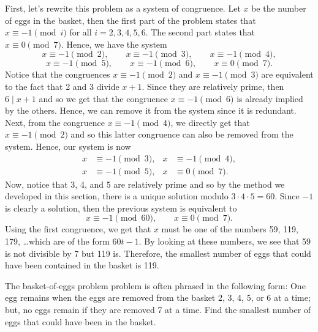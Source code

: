 \begin{solution}
    First, let's rewrite this problem as a system of congruence. Let $x$ be the number of eggs in the basket, then the first part of the problem states that $x \equiv -1 \pmod{i}$ for all $i = 2,3,4,5,6$. The second part states that $x \equiv 0 \pmod 7$. Hence, we have the system
    $$x \equiv -1 \pmod 2, \qquad x \equiv -1 \pmod 3, \qquad x \equiv -1 \pmod 4,$$
    $$x \equiv -1 \pmod 5, \qquad x \equiv -1 \pmod 6, \qquad x \equiv 0 \pmod 7.$$
    Notice that the congruences $x \equiv -1 \pmod 2$ and $x \equiv -1 \pmod 3$ are equivalent to the fact that 2 and 3 divide $x + 1$. Since they are relatively prime, then $6 \mid x + 1$ and so we get that the congruence $x \equiv -1 \pmod 6$ is already implied by the others. Hence, we can remove it from the system since it is redundant. Next, from the congruence $x \equiv -1 \pmod{4}$, we directly get that $x \equiv -1 \pmod 2$ and so this latter congruence can also be removed from the system. Hence, our system is now
    \begin{align*}
        x &\equiv -1 \pmod 3, & x &\equiv -1 \pmod 4, \\
        x &\equiv -1 \pmod 5, & x &\equiv 0 \pmod 7.
    \end{align*}
    Now, notice that 3, 4, and 5 are relatively prime and so by the method we developed in this section, there is a unique solution modulo $3 \cdot 4 \cdot 5 = 60$. Since $-1$ is clearly a solution, then the previous system is equivalent to
    $$x \equiv -1 \pmod{60}, \qquad x \equiv 0 \pmod 7.$$
    Using the first congruence, we get that $x$ must be one of the numbers 59, 119, 179, \dots which are of the form $60t - 1$. By looking at these numbers, we see that 59 is not divisible by 7 but 119 is. Therefore, the smallest number of eggs that could have been contained in the basket is 119. \\
\end{solution}

\begin{exercise}
    The basket-of-eggs problem problem is often phrased in the following form: One egg remains when the eggs are removed from the basket 2, 3, 4, 5, or 6 at a time; but, no eggs remain if they are removed 7 at a time. Find the smallest number of eggs that could have been in the basket. \\
\end{exercise}

